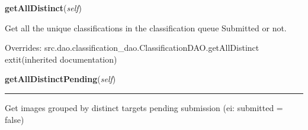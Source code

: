 \hspace{.8\funcindent}\begin{boxedminipage}{\funcwidth}

    \raggedright \textbf{getAllDistinct}(\textit{self})

\setlength{\parskip}{2ex}
    Get all the unique classifications in the classification queue 
    Submitted or not.

\setlength{\parskip}{1ex}
      Overrides: src.dao.classification\_dao.ClassificationDAO.getAllDistinct 	extit{(inherited documentation)}

    \end{boxedminipage}

    \label{src:dao:outgoing_autonomous_dao:OutgoingAutonomousDAO:getAllDistinctPending}

    \vspace{0.5ex}

\hspace{.8\funcindent}\begin{boxedminipage}{\funcwidth}

    \raggedright \textbf{getAllDistinctPending}(\textit{self})

    \vspace{-1.5ex}

    \rule{\textwidth}{0.5\fboxrule}
\setlength{\parskip}{2ex}
    Get images grouped by distinct targets pending submission (ei: 
    submitted = false)

\setlength{\parskip}{1ex}
    \end{boxedminipage}

    \label{src:dao:outgoing_autonomous_dao:OutgoingAutonomousDAO:newModelFromRow}

    \vspace{0.5ex}

